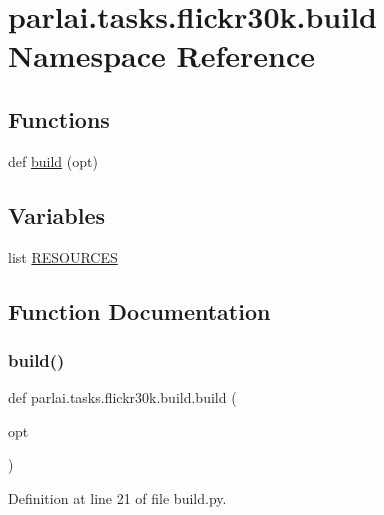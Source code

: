 \hypertarget{namespaceparlai_1_1tasks_1_1flickr30k_1_1build}{}\section{parlai.\+tasks.\+flickr30k.\+build Namespace Reference}
\label{namespaceparlai_1_1tasks_1_1flickr30k_1_1build}
\subsection*{Functions}
\begin{DoxyCompactItemize}
\item 
def \hyperlink{namespaceparlai_1_1tasks_1_1flickr30k_1_1build_a45b58a1c8d68443baba41a4f9290967d}{build} (opt)
\end{DoxyCompactItemize}
\subsection*{Variables}
\begin{DoxyCompactItemize}
\item 
list \hyperlink{namespaceparlai_1_1tasks_1_1flickr30k_1_1build_abd16c32208cabae507c611c0c7d641c9}{R\+E\+S\+O\+U\+R\+C\+ES}
\end{DoxyCompactItemize}


\subsection{Function Documentation}
\mbox{\label{namespaceparlai_1_1tasks_1_1flickr30k_1_1build_a45b58a1c8d68443baba41a4f9290967d}} 
\subsubsection{\texorpdfstring{build()}{build()}}
{\footnotesize\ttfamily def parlai.\+tasks.\+flickr30k.\+build.\+build (\begin{DoxyParamCaption}\item[{}]{opt }\end{DoxyParamCaption})}



Definition at line 21 of file build.\+py.


